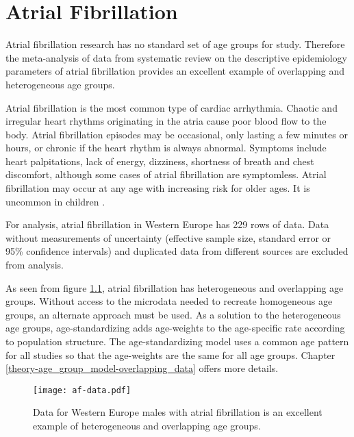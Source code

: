 \chapter{Atrial Fibrillation}
\label{applications-age_groups}

Atrial fibrillation research has no standard set of age groups for study.  Therefore the meta-analysis of data from systematic review on the descriptive epidemiology parameters of atrial fibrillation provides an excellent example of overlapping and heterogeneous age groups.

Atrial fibrillation is the most common type of cardiac arrhythmia.  Chaotic and irregular heart rhythms originating in the atria cause poor blood flow to the body.  Atrial fibrillation episodes may be occasional, only lasting a few minutes or hours, or chronic if the heart rhythm is always abnormal.  Symptoms include heart palpitations, lack of energy, dizziness, shortness of breath and chest discomfort, although some cases of atrial fibrillation are symptomless.  Atrial fibrillation may occur at any age with increasing risk for older ages.  It is uncommon in children \cite{rich_epidemiology_2009, rho_asymptomoatic_2005, american_acc_2006, radford_atiral_1977}.

For analysis, atrial fibrillation in Western Europe has 229 rows of data.  Data without measurements of uncertainty (effective sample size, standard error or 95\% confidence intervals) and duplicated data from different sources are excluded from analysis.

As seen from figure \ref{fig:app-af data}, atrial fibrillation has heterogeneous and overlapping age groups.  Without access to the microdata needed to recreate homogeneous age groups, an alternate approach must be used.  As a solution to the heterogeneous age groups, age-standardizing adds age-weights to the age-specific rate according to population structure.  The age-standardizing model uses a common age pattern for all studies so that the age-weights are the same for all age groups.  Chapter \ref{theory-age_group_model-overlapping_data} offers more details.

    \begin{figure}[h]
        \begin{center}
            \texttt{[image: af-data.pdf]}
            \caption{Data for Western Europe males with atrial fibrillation is an excellent example of heterogeneous and overlapping age groups.}
            \label{fig:app-af data}
        \end{center}
    \end{figure}


